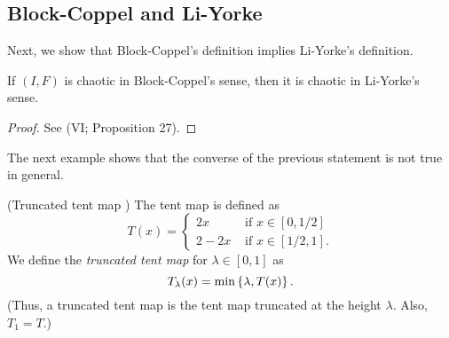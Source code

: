 \documentclass[12pt,twoside,draft]{book}
\begin{document}
\subsection*{Block-Coppel and Li-Yorke}
Next, we show that Block-Coppel's definition implies Li-Yorke's definition.
\begin{theorem}
  \citep{blockcoppel}
  If $(I,F)$ is chaotic in Block-Coppel's sense, then it is chaotic in Li-Yorke's sense.
  \label{thm:devaney-liyorke}
  \begin{proof}
    See \citet{blockcoppel} (VI; Proposition 27).
  \end{proof}
\end{theorem}
The next example shows that the converse of the previous statement is not true in general.
\begin{example}
  (Truncated tent map \citep{aulbach})
  The tent map is defined as
  \begin{equation*}
    T(x) = 
    \begin{cases}
      2x     &\mbox{ if } x \in [0,1/2] \\
      2 - 2x &\mbox{ if } x \in [1/2,1].
    \end{cases}
  \end{equation*}
  We define the \textit{truncated tent map} for $\lambda \in [0,1]$ as 
  \begin{equation*}
    T_\lambda(x) = \min\left \{ \lambda, T(x) \right \}.
  \end{equation*}
  (Thus, a truncated tent map is the tent map truncated at the height $\lambda$.
  Also, $T_1 = T$.)

  \begin{figure}[th]
    \centering
\end{figure}
\end{example}
\end{document}
